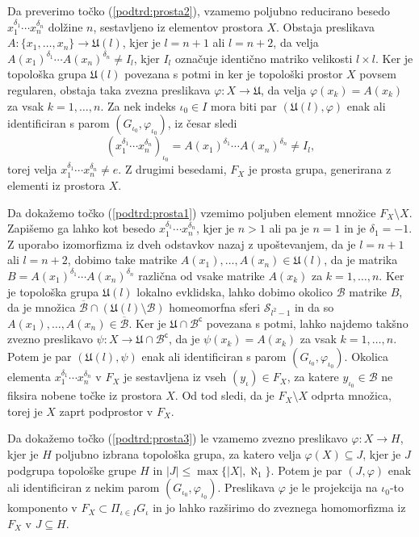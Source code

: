 \documentclass[mat1]{fmfdelo}
\newcommand{\closure}[1]{\overline{#1}}
\begin{document}
\begin{dokaz}
Da preverimo točko (\ref{podtrd:prosta2}), vzamemo poljubno reducirano besedo $x_1^{\delta_1}\cdots x_n^{\delta_n}$ dolžine $n$, sestavljeno iz elementov prostora $X$.
Obstaja preslikava $A\colon\lbrace x_1, \dots,x_n\rbrace \to \mathfrak{U}(l)$, kjer je $l = n + 1$ ali $l = n + 2$, da velja $A(x_1)^{\delta_1}\cdots A(x_n)^{\delta_n} \neq I_l$, kjer $I_l$ označuje identično matriko velikosti $l \times l$. Ker je topološka grupa $\mathfrak{U}(l)$ povezana s potmi in ker je topološki prostor $X$ povsem regularen, obstaja taka zvezna preslikava $\varphi\colon X \to \mathfrak{U}$, da velja $\varphi(x_k) = A(x_k)$ za vsak $k = 1,\dots,n$. Za nek indeks $\iota_0 \in I$ mora biti par $(\mathfrak{U}(l), \varphi)$ enak ali identificiran s parom $(G_{\iota_0}, \varphi_{\iota_0})$, iz česar sledi
\[ (x_1^{\delta_1}\cdots x_n^{\delta_n})_{\iota_0} = A(x_1)^{\delta_1}\cdots A(x_n)^{\delta_n} \neq I_l, \]
torej velja $x_1^{\delta_1}\cdots x_n^{\delta_n} \neq e$. Z drugimi besedami, $F_X$ je prosta grupa, generirana z elementi iz prostora $X$.

Da dokažemo točko (\ref{podtrd:prosta1}) vzemimo poljuben element množice $F_X\setminus X$. Zapišemo ga lahko kot besedo $x_1^{\delta_1}\cdots x_n^{\delta_n}$, kjer je $n > 1$ ali pa je $n = 1$ in je $\delta_1 = -1$. Z uporabo izomorfizma iz dveh odstavkov nazaj z upoštevanjem, da je $l = n + 1$ ali $l = n + 2$, dobimo take matrike $A(x_1),\dots,A(x_n) \in \mathfrak{U}(l)$, da je matrika $B = A(x_1)^{\delta_1}\cdots A(x_n)^{\delta_n}$ različna od vsake matrike $A(x_k)$ za $k = 1,\dots,n$. Ker je topološka grupa $\mathfrak{U}(l)$ lokalno evklidska, lahko dobimo okolico $\mathcal{B}$ matrike $B$, da je množica $\closure{\mathcal{B}}\cap (\mathfrak{U}(l)\setminus \mathcal{B})$ homeomorfna sferi $\mathcal{S}_{l^2 - 1}$ in da so $A(x_1),\dots,A(x_n) \in \closure{\mathcal{B}}$. Ker je $\mathfrak{U}\cap\mathcal{B}^{\mathsf{c}}$ povezana s potmi, lahko najdemo takšno zvezno preslikavo $\psi\colon X \to \mathfrak{U}\cap\mathcal{B}^{\mathsf{c}}$, da je $\psi(x_k) = A(x_k)$ za vsak $k = 1,\dots,n$. Potem je par $(\mathfrak{U}(l), \psi)$ enak ali identificiran s parom $(G_{\iota_0}, \varphi_{\iota_0})$. Okolica elementa $x_1^{\delta_1}\cdots x_n^{\delta_n}$ v $F_X$ je sestavljena iz vseh $(y_\iota) \in F_X$, za katere $y_{\iota_0}\in\mathcal{B}$ ne fiksira nobene točke iz prostora $X$. Od tod sledi, da je $F_X \setminus X$ odprta množica, torej je $X$ zaprt podprostor v $F_X$.

Da dokažemo točko (\ref{podtrd:prosta3}) le vzamemo zvezno preslikavo $\varphi\colon X \to H$, kjer je $H$ poljubno izbrana topološka grupa, za katero velja $\varphi(X) \subseteq J$, kjer je $J$ podgrupa topološke grupe $H$ in $|J| \leq \max\lbrace |X|, \aleph_1\rbrace$. Potem je par $(J, \varphi)$ enak ali identificiran z nekim parom $(G_{\iota_0}, \varphi_{\iota_0})$. Preslikava $\varphi$ je le projekcija na $\iota_0$-to komponento v $F_X \subset \Pi_{\iota \in I}G_\iota$ in jo lahko razširimo do zveznega homomorfizma iz $F_X$ v $J \subseteq H$.
\end{dokaz}
\end{document}
